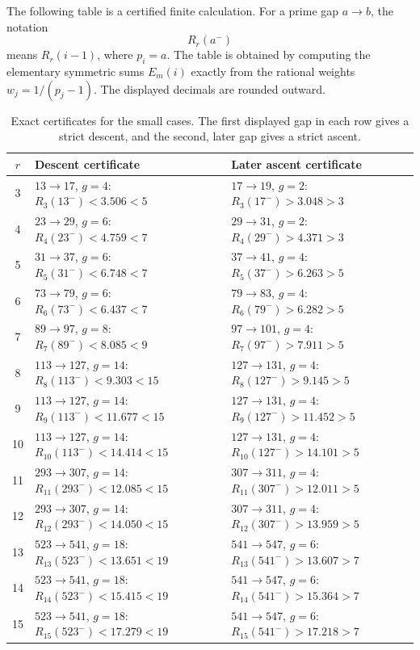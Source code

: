 \documentclass[11pt]{article}
\numberwithin{equation}{section}
\theoremstyle{plain}
\theoremstyle{definition}
\theoremstyle{remark}
\begin{document}
The following table is a certified finite calculation.  For a prime gap \(a\to b\), the notation
\[
        R_r(a^-)
\]
means \(R_r(i-1)\), where \(p_i=a\).  The table is obtained by computing the elementary symmetric sums \(E_m(i)\) exactly from the rational weights \(w_j=1/(p_j-1)\).  The displayed decimals are rounded outward.

\begin{table}[htbp]
\centering
\small
\caption{Exact certificates for the small cases. The first displayed gap in each row gives a strict descent, and the second, later gap gives a strict ascent.}
\label{tab:smallcases}
\setlength{\tabcolsep}{4pt}
\begin{tabularx}{\textwidth}{cYY}
\toprule
\(r\) & Descent certificate & Later ascent certificate\\
 & \(13\to17\), \(g=4\): \(R_3(13^-)<3.506<5\) & \(17\to19\), \(g=2\): \(R_3(17^-)>3.048>3\) \\
4 & \(23\to29\), \(g=6\): \(R_4(23^-)<4.759<7\) & \(29\to31\), \(g=2\): \(R_4(29^-)>4.371>3\) \\
5 & \(31\to37\), \(g=6\): \(R_5(31^-)<6.748<7\) & \(37\to41\), \(g=4\): \(R_5(37^-)>6.263>5\) \\
6 & \(73\to79\), \(g=6\): \(R_6(73^-)<6.437<7\) & \(79\to83\), \(g=4\): \(R_6(79^-)>6.282>5\) \\
7 & \(89\to97\), \(g=8\): \(R_7(89^-)<8.085<9\) & \(97\to101\), \(g=4\): \(R_7(97^-)>7.911>5\) \\
8 & \(113\to127\), \(g=14\): \(R_8(113^-)<9.303<15\) & \(127\to131\), \(g=4\): \(R_8(127^-)>9.145>5\) \\
9 & \(113\to127\), \(g=14\): \(R_9(113^-)<11.677<15\) & \(127\to131\), \(g=4\): \(R_9(127^-)>11.452>5\) \\
10 & \(113\to127\), \(g=14\): \(R_{10}(113^-)<14.414<15\) & \(127\to131\), \(g=4\): \(R_{10}(127^-)>14.101>5\) \\
11 & \(293\to307\), \(g=14\): \(R_{11}(293^-)<12.085<15\) & \(307\to311\), \(g=4\): \(R_{11}(307^-)>12.011>5\) \\
12 & \(293\to307\), \(g=14\): \(R_{12}(293^-)<14.050<15\) & \(307\to311\), \(g=4\): \(R_{12}(307^-)>13.959>5\) \\
13 & \(523\to541\), \(g=18\): \(R_{13}(523^-)<13.651<19\) & \(541\to547\), \(g=6\): \(R_{13}(541^-)>13.607>7\) \\
14 & \(523\to541\), \(g=18\): \(R_{14}(523^-)<15.415<19\) & \(541\to547\), \(g=6\): \(R_{14}(541^-)>15.364>7\) \\
15 & \(523\to541\), \(g=18\): \(R_{15}(523^-)<17.279<19\) & \(541\to547\), \(g=6\): \(R_{15}(541^-)>17.218>7\) \\

\end{tabularx}
\end{table}
\end{document}
